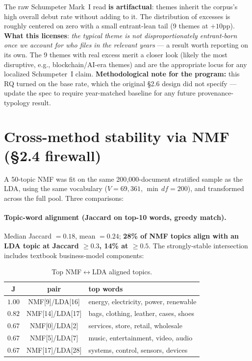 \documentclass[11pt]{article}
\begin{document}
\noindent The raw Schumpeter Mark~I read \textbf{is artifactual}: themes
inherit the corpus's high overall debut rate without adding to it. The
distribution of excesses is roughly centered on zero with a small entrant-lean
tail (9 themes at $+10$pp). \textbf{What this licenses}: \emph{the typical
theme is not disproportionately entrant-born once we account for who files in
the relevant years} --- a result worth reporting on its own. The 9 themes with
real excess merit a closer look (likely the most disruptive, e.g.,
blockchain/AI-era themes) and are the appropriate locus for any localized
Schumpeter~I claim. \textbf{Methodological note for the program:} this RQ
turned on the base rate, which the original §2.6 design did not specify ---
update the spec to require year-matched baseline for any future
provenance-typology result.

\section{Cross-method stability via NMF (§2.4 firewall)}
A 50-topic NMF was fit on the same 200{,}000-document stratified sample as the
LDA, using the same vocabulary ($V = 69{,}361$, $\min\,df = 200$), and
transformed across the full pool. Three comparisons:

\paragraph{Topic-word alignment (Jaccard on top-10 words, greedy match).}
Median Jaccard $= 0.18$, mean $= 0.24$; \textbf{28\% of NMF topics align with
an LDA topic at Jaccard $\geq 0.3$, 14\% at $\geq 0.5$}. The strongly-stable
intersection includes textbook business-model components:

\begin{table}[h]\centering\small
\caption{Top NMF$\leftrightarrow$LDA aligned topics.}
\begin{tabular}{ccp{}}
\toprule
J & pair & top words \\
\midrule
$1.00$ & NMF[9]/LDA[16] & energy, electricity, power, renewable \\
$0.82$ & NMF[14]/LDA[17]& bags, clothing, leather, cases, shoes \\
$0.67$ & NMF[0]/LDA[2]  & services, store, retail, wholesale \\
$0.67$ & NMF[5]/LDA[7]  & music, entertainment, video, audio \\
$0.67$ & NMF[17]/LDA[28]& systems, control, sensors, devices \\
\bottomrule
\end{tabular}
\end{table}
\end{document}

